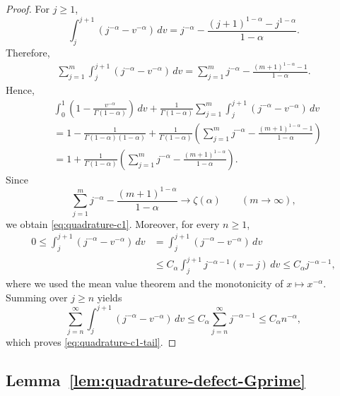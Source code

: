 \documentclass[letterpaper]{article}
\numberwithin{equation}{section}
\theoremstyle{definition}
\theoremstyle{remark}
\begin{document}
\begin{proof}
For $j\ge1$,
\[
  \int_j^{j+1}(j^{-\alpha}-v^{-\alpha})\,dv
  =
  j^{-\alpha}
  -
  \frac{(j+1)^{1-\alpha}-j^{1-\alpha}}{1-\alpha}.
\]
Therefore,
\begin{align*}
  \sum_{j=1}^{m}\int_j^{j+1}(j^{-\alpha}-v^{-\alpha})\,dv
  =
  \sum_{j=1}^{m}j^{-\alpha}
  -
  \frac{(m+1)^{1-\alpha}-1}{1-\alpha}.
\end{align*}
Hence,
\begin{align*}
  &\int_0^1\left(1-\frac{v^{-\alpha}}{\Gamma(1-\alpha)}\right)\,dv
  +
  \frac1{\Gamma(1-\alpha)}
  \sum_{j=1}^{m}\int_j^{j+1}(j^{-\alpha}-v^{-\alpha})\,dv
  \\
  &=
  1-\frac{1}{\Gamma(1-\alpha)(1-\alpha)}
  +
  \frac1{\Gamma(1-\alpha)}
  \left(
    \sum_{j=1}^{m}j^{-\alpha}
    -
    \frac{(m+1)^{1-\alpha}-1}{1-\alpha}
  \right)
  \\
  &=
  1+\frac1{\Gamma(1-\alpha)}
  \left(
    \sum_{j=1}^{m}j^{-\alpha}
    -
    \frac{(m+1)^{1-\alpha}}{1-\alpha}
  \right).
\end{align*}
Since
\[
  \sum_{j=1}^{m}j^{-\alpha}
  -\frac{(m+1)^{1-\alpha}}{1-\alpha}
  \to \zeta(\alpha)
  \qquad (m\to\infty),
\]
we obtain \eqref{eq:quadrature-c1}. Moreover, for every $n\ge1$,
\begin{align*}
  0
  \le
  \int_j^{j+1}(j^{-\alpha}-v^{-\alpha})\,dv
  &=
  \int_j^{j+1}\left(j^{-\alpha}-v^{-\alpha}\right)\,dv
  \\
  &\le
  C_\alpha\int_j^{j+1}j^{-\alpha-1}(v-j)\,dv
\le
  C_\alpha j^{-\alpha-1},
\end{align*}
where we used the mean value theorem and the monotonicity of
$x\mapsto x^{-\alpha}$. Summing over $j\ge n$ yields
\[
  \sum_{j=n}^{\infty}\int_j^{j+1}(j^{-\alpha}-v^{-\alpha})\,dv
  \le
  C_\alpha\sum_{j=n}^{\infty}j^{-\alpha-1}
  \le
  C_\alpha n^{-\alpha},
\]
which proves \eqref{eq:quadrature-c1-tail}.
\end{proof}


\subsection{Lemma~\ref{lem:quadrature-defect-Gprime}}\label{app:proof-quadrature-defect-Gprime}
\end{document}
